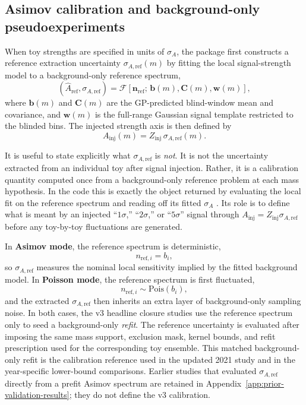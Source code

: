 \FloatBarrier

\subsection{Asimov calibration and background-only pseudoexperiments}

When toy strengths are specified in units of $\sigma_A$, the package first constructs a
reference extraction uncertainty $\sigma_{A,\mathrm{ref}}(m)$ by fitting the local
signal-strength model to a background-only reference spectrum,
\begin{equation}
\left(\hat A_{\mathrm{ref}},\sigma_{A,\mathrm{ref}}\right)
=
\mathcal{F}\!\left[\bm{n}_{\mathrm{ref}};\,\bm{b}(m),\bm{C}(m),\bm{w}(m)\right],
\end{equation}
where $\bm{b}(m)$ and $\bm{C}(m)$ are the GP-predicted blind-window mean and covariance,
and $\bm{w}(m)$ is the full-range Gaussian signal template restricted to the blinded
bins. The injected strength axis is then defined by
\begin{equation}
A_{\mathrm{inj}}(m) = Z_{\mathrm{inj}}\,\sigma_{A,\mathrm{ref}}(m).
\end{equation}

It is useful to state explicitly what $\sigma_{A,\mathrm{ref}}$ is \emph{not}. It is
not the uncertainty extracted from an individual toy after signal injection. Rather, it
is a calibration quantity computed once from a background-only reference problem at each
mass hypothesis. In the code this is exactly the object returned by evaluating the local
fit on the reference spectrum and reading off its fitted $\sigma_A$
\cite{Cowan1998,Cowan2011}. Its role is to define what is meant by an injected
``$1\sigma$,'' ``$2\sigma$,'' or ``$5\sigma$'' signal through
$A_{\mathrm{inj}}=Z_{\mathrm{inj}}\sigma_{A,\mathrm{ref}}$ before any toy-by-toy
fluctuations are generated.

In \textbf{Asimov mode}, the reference spectrum is deterministic,
\begin{equation}
n_{\mathrm{ref},i} = b_i,
\end{equation}
so $\sigma_{A,\mathrm{ref}}$ measures the nominal local sensitivity implied by the
fitted background model. In \textbf{Poisson mode}, the reference spectrum is first
fluctuated,
\begin{equation}
n_{\mathrm{ref},i} \sim \mathrm{Pois}\!\left(b_i\right),
\end{equation}
and the extracted $\sigma_{A,\mathrm{ref}}$ then inherits an extra layer of
background-only sampling noise. In both cases, the v3 headline closure studies use the
reference spectrum only to seed a background-only \emph{refit}. The reference
uncertainty is evaluated after imposing the same mass support, exclusion mask, kernel
bounds, and refit prescription used for the corresponding toy ensemble. This matched
background-only refit is the calibration reference used in the updated 2021 study and
in the year-specific lower-bound comparisons. Earlier studies that evaluated
$\sigma_{A,\mathrm{ref}}$ directly from a prefit Asimov spectrum are retained in
Appendix~\ref{app:prior-validation-results}; they do not define the v3 calibration.

